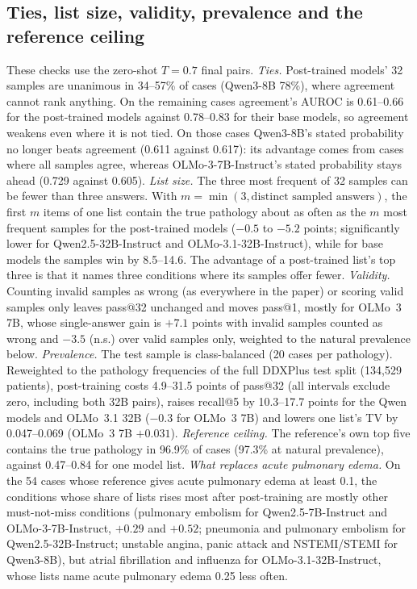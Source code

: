 \documentclass[wcp]{jmlr}
\begin{document}
\subsection{Ties, list size, validity, prevalence and the reference ceiling}\label{sec:further}
These checks use the zero-shot $T{=}0.7$ final pairs.
\emph{Ties.} Post-trained models' 32 samples are unanimous in 34--57\% of cases (Qwen3-8B 78\%), where agreement cannot rank anything. On the remaining cases agreement's AUROC is 0.61--0.66 for the post-trained models against 0.78--0.83 for their base models, so agreement weakens even where it is not tied. On those cases Qwen3-8B's stated probability no longer beats agreement (0.611 against 0.617): its advantage comes from cases where all samples agree, whereas OLMo-3-7B-Instruct's stated probability stays ahead (0.729 against 0.605).
\emph{List size.} The three most frequent of 32 samples can be fewer than three answers. With $m = \min(3, \text{distinct sampled answers})$, the first $m$ items of one list contain the true pathology about as often as the $m$ most frequent samples for the post-trained models ($-0.5$ to $-5.2$ points; significantly lower for Qwen2.5-32B-Instruct and OLMo-3.1-32B-Instruct), while for base models the samples win by 8.5--14.6. The advantage of a post-trained list's top three is that it names three conditions where its samples offer fewer.
\emph{Validity.} Counting invalid samples as wrong (as everywhere in the paper) or scoring valid samples only leaves pass@32 unchanged and moves pass@1, mostly for OLMo~3 7B, whose single-answer gain is $+7.1$ points with invalid samples counted as wrong and $-3.5$ (n.s.) over valid samples only, weighted to the natural prevalence below.
\emph{Prevalence.} The test sample is class-balanced (20 cases per pathology). Reweighted to the pathology frequencies of the full DDXPlus test split (134,529 patients), post-training costs 4.9--31.5 points of pass@32 (all intervals exclude zero, including both 32B pairs), raises recall@5 by 10.3--17.7 points for the Qwen models and OLMo~3.1 32B ($-0.3$ for OLMo~3 7B) and lowers one list's TV by 0.047--0.069 (OLMo~3 7B $+0.031$).
\emph{Reference ceiling.} The reference's own top five contains the true pathology in 96.9\% of cases (97.3\% at natural prevalence), against 0.47--0.84 for one model list.
\emph{What replaces acute pulmonary edema.} On the 54 cases whose reference gives acute pulmonary edema at least 0.1, the conditions whose share of lists rises most after post-training are mostly other must-not-miss conditions (pulmonary embolism for Qwen2.5-7B-Instruct and OLMo-3-7B-Instruct, $+0.29$ and $+0.52$; pneumonia and pulmonary embolism for Qwen2.5-32B-Instruct; unstable angina, panic attack and NSTEMI/STEMI for Qwen3-8B), but atrial fibrillation and influenza for OLMo-3.1-32B-Instruct, whose lists name acute pulmonary edema 0.25 less often.
\end{document}
